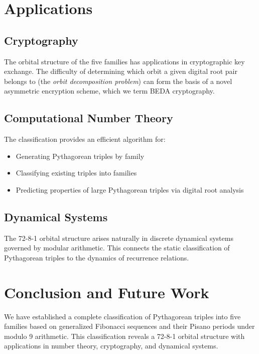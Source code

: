 \documentclass[12pt]{article}
\begin{document}
\section{Applications}

\subsection{Cryptography}

The orbital structure of the five families has applications in cryptographic key exchange. The difficulty of determining which orbit a given digital root pair belongs to (the \emph{orbit decomposition problem}) can form the basis of a novel asymmetric encryption scheme, which we term BEDA cryptography.

\subsection{Computational Number Theory}

The classification provides an efficient algorithm for:
\begin{itemize}
\item Generating Pythagorean triples by family
\item Classifying existing triples into families
\item Predicting properties of large Pythagorean triples via digital root analysis
\end{itemize}

\subsection{Dynamical Systems}

The 72-8-1 orbital structure arises naturally in discrete dynamical systems governed by modular arithmetic. This connects the static classification of Pythagorean triples to the dynamics of recurrence relations.

\section{Conclusion and Future Work}

We have established a complete classification of Pythagorean triples into five families based on generalized Fibonacci sequences and their Pisano periods under modulo 9 arithmetic. This classification reveals a 72-8-1 orbital structure with applications in number theory, cryptography, and dynamical systems.
\end{document}
